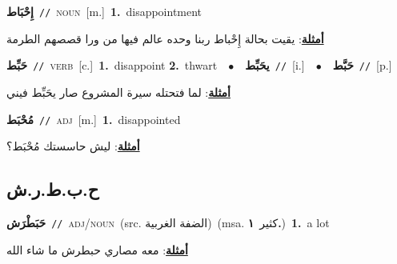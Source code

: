 \documentclass[10pt,a4paper,twoside]{article} %
\begin{document}
\begin{multicols}{2}
{{{{{{\setlength\topsep{0pt}\textbf{\foreignlanguage{arabic}{إِحْبَاط}}\ {\color{gray}\texttt{//}\color{black}}\ \textsc{noun}\ [m.]\ \textbf{1.}~disappointment\  \begin{flushright}\color{gray}\foreignlanguage{arabic}{\textbf{\underline{\foreignlanguage{arabic}{أمثلة}}}: يقيت بحالة إِحْباط ربنا وحده عالم فيها من ورا قصصهم الطرمة}\end{flushright}\color{black}} \vspace{2mm}

{\setlength\topsep{0pt}\textbf{\foreignlanguage{arabic}{حَبِّط}}\ {\color{gray}\texttt{//}\color{black}}\ \textsc{verb}\ [c.]\ \textbf{1.}~disappoint  \textbf{2.}~thwart\ \ $\bullet$\ \ \setlength\topsep{0pt}\textbf{\foreignlanguage{arabic}{يحَبِّط}}\ {\color{gray}\texttt{//}\color{black}}\ [i.]\ \ $\bullet$\ \ \setlength\topsep{0pt}\textbf{\foreignlanguage{arabic}{حَبَّط}}\ {\color{gray}\texttt{//}\color{black}}\ [p.]\  \begin{flushright}\color{gray}\foreignlanguage{arabic}{\textbf{\underline{\foreignlanguage{arabic}{أمثلة}}}: لما فتحتله سيرة المشروع صار يحَبِّط فيني}\end{flushright}\color{black}} \vspace{2mm}

{\setlength\topsep{0pt}\textbf{\foreignlanguage{arabic}{مُحْبَط}}\ {\color{gray}\texttt{//}\color{black}}\ \textsc{adj}\ [m.]\ \textbf{1.}~disappointed\  \begin{flushright}\color{gray}\foreignlanguage{arabic}{\textbf{\underline{\foreignlanguage{arabic}{أمثلة}}}: ليش حاسستك مُحْبَط؟}\end{flushright}\color{black}} \vspace{2mm}

\vspace{-3mm}
\subsection*{\color{blue}\foreignlanguage{arabic}{ح.ب.ط.ر.ش}\color{blue}{ (ntws)}} 

{\setlength\topsep{0pt}\textbf{\foreignlanguage{arabic}{حَبَطْرَش}}\ {\color{gray}\texttt{//}\color{black}}\ \textsc{adj/noun}\ (src. \color{gray}\foreignlanguage{arabic}{الضفة الغربية}\color{black})\ \color{gray}(msa. \foreignlanguage{arabic}{كثير}~\foreignlanguage{arabic}{\textbf{١.}})\color{black}\ \textbf{1.}~a lot\  \begin{flushright}\color{gray}\foreignlanguage{arabic}{\textbf{\underline{\foreignlanguage{arabic}{أمثلة}}}: معه مصاري حبطرش ما شاء الله}\end{flushright}\color{black}} \vspace{2mm}

}}}}}
\end{multicols}
\end{document}
